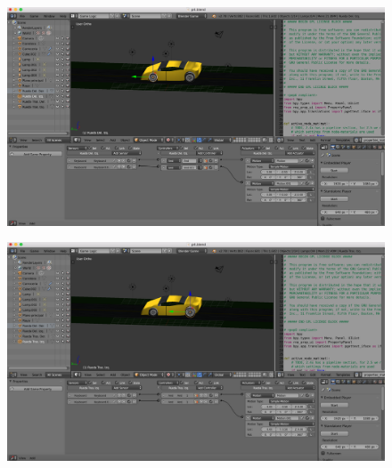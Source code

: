 \documentclass[10pt]{article}
\begin{document}
\begin{figure}[H]
	\begin{center}
	 		\includegraphics[width = 1.00\textwidth]{Imagenes/p4-img13}
	\end{center} 
\end{figure}

\begin{figure}[H]
	\begin{center}
	 		\includegraphics[width = 1.00\textwidth]{Imagenes/p4-img14}
	\end{center} 
\end{figure}
\end{document}
